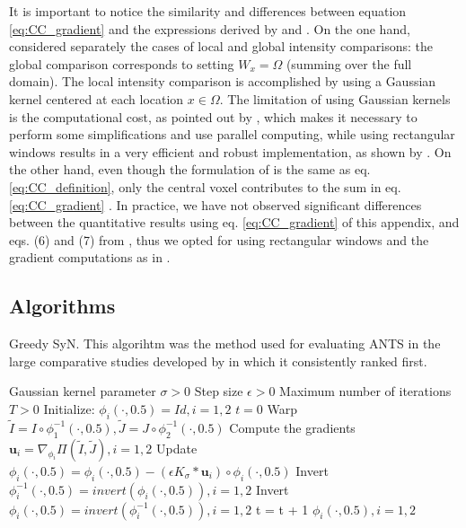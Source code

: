 It is important to notice the similarity and differences between equation \eqref{eq:CC_gradient} and the expressions derived by \cite{Hermosillo2004}
and \cite{Avants2008}. On the one hand, \cite{Hermosillo2004} considered separately the cases of local and global intensity comparisons: the global comparison corresponds to setting $W_{x} = \Omega$ (summing over the full domain). The local intensity comparison is accomplished by using a Gaussian kernel centered at each location $x\in\Omega$. The limitation of using Gaussian kernels is the computational cost, as pointed out by \cite{Hermosillo2004}, which makes it necessary to perform some simplifications and use parallel computing, while using rectangular windows results in a very efficient and robust implementation, as shown by \cite{Avants2008}. On the other hand, even though the formulation of \cite{Avants2008} is the same as eq. \eqref{eq:CC_definition}, only the central voxel contributes to the sum in eq. \eqref{eq:CC_gradient} \citep[see][eqs. 6, 7]{Avants2008}. In practice, we have not observed significant differences between the quantitative results using eq. \eqref{eq:CC_gradient} of this appendix, and eqs. (6) and (7) from \cite{Avants2008}, thus we opted for using rectangular windows and the gradient computations as in \cite{Avants2008}.

\subsection{Algorithms}\label{ap:Algorithms}
\begin{algorithm}[h!]
\caption{Greedy SyN. This algorihtm was the method used for evaluating ANTS \citep{Avants2011} in the large comparative studies developed by \cite{Klein2009, Klein2010} in which it consistently ranked first.}\label{alg:Greedy_SyN}
\begin{algorithmic}[1]
\REQUIRE Gaussian kernel parameter $\sigma>0$
\REQUIRE Step size $\epsilon>0$
\REQUIRE Maximum number of iterations $T>0$
\STATE Initialize: $\phi_{i}(\cdot, 0.5) = Id, i=1, 2$
\STATE $t=0$
\REPEAT
    \STATE Warp $\tilde{I}  = I \circ \phi_{1}^{-1}(\cdot, 0.5), \tilde{J} = J \circ \phi_{2}^{-1}(\cdot, 0.5)$
    \STATE Compute the gradients $\mathbf{u}_{i} = \nabla_{\phi_{i}} \Pi(\tilde{I}, \tilde{J}), i=1,2$
    \STATE Update $\phi_{i}(\cdot, 0.5) = \phi_{i}(\cdot, 0.5) - \left( \epsilon K_{\sigma} \ast \mathbf{u}_{i} \right) \circ \phi_{i}(\cdot, 0.5)$
    \STATE Invert $\phi_{i}^{-1}(\cdot, 0.5) = invert (\phi_{i}(\cdot, 0.5)), i=1, 2$
    \STATE Invert $\phi_{i}(\cdot, 0.5) = invert (\phi_{i}^{-1}(\cdot, 0.5)), i=1, 2$
    \STATE t = t + 1
\RETURN $\phi_{i}(\cdot, 0.5), i=1,2$
\end{algorithmic}
\end{algorithm}


